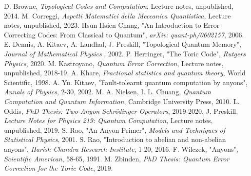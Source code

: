 \documentclass{Configuration_Files/PoliMi3i_thesis}
\begin{document}
\begin{thebibliography}{99} %
	 D. Browne, {\it Topological Codes and Computation}, Lecture notes, unpublished, 2014.
	 M. Correggi, \textit{Aspetti Matematici della Meccanica Quantistica}, Lecture notes, unpublished, 2023.
	 Hsun-Hsien Chang, "An Introduction to Error-Correcting Codes: From Classical to Quantum", {\it arXiv: quant-ph/0602157}, 2006.
	 E. Dennis, A. Kitaev, A. Landhal, J. Preskill, "Topological Quantum Memory", {\it Journal of Mathematical Physics }, 2002.
	 P. Herringer, "The Toric Code", {\it Rutgers Physics}, 2020.
	 M. Kastroyano, {\it Quantum Error Correction}, Lecture notes, unpublished, 2018-19.
	 A. Khare, {\it Fractional statistics and quantum theory}, World Scientific, 1998.
	 A. Yu. Kitaev, "Fault-tolearnt quantum computation by anyons", {\it Annals of Physics}, 2-30, 2002.
	 M. A. Nielsen, I. L. Chuang, {\it Quantum Computation and Quantum Information}, Cambridge University Press, 2010.
	 L. Oddis, {\it PhD Thesis: Two-Anyon Schrödinger Operators}, 2019-2020.
	 J. Preskill, {\it Lecture Notes for Physics 219:
		Quantum Computation}, Lecture notes, unpublished, 2019.
	 S. Rao, "An Anyon Primer", {\it Models and Techniques of Statistical Physics}, 2001.
	 S. Rao, "Introduction to abelian and non-abelian anyons", {\it Harish-Chandra Research Institute}, 1-20, {2016}.
	 F. Wilczek, "Anyons", {\it Scientific American}, 58-65, 1991.
	 M. Zbinden, {\it PhD Thesis: Quantum Error Correction for the Toric Code}, 2019.

\end{thebibliography}



\cleardoublepage
{} %
\end{document}
